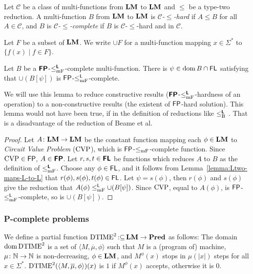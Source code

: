 \documentclass[envcountsame,orivec,oribibl]{llncs}
\newcommand{\pcolon}{\mathpunct{\,:\subseteq}}
\begin{document}
Let $\mathcal{C}$ be a class of multi-functions from $\mathbf{LM}$ to $\mathbf{LM}$
and $\leq$ be a type-two reduction.
A multi-function $B$ from $\mathbf{LM}$ to $\mathbf{LM}$ is \emph{$\mathcal{C}$-$\leq$-hard} if $A \leq B$ for all $A \in \mathcal{C}$,
and $B$ is \emph{$\mathcal{C}$-$\leq$-complete} 
if $B$ is $\mathcal{C}$-$\leq$-hard and in $\mathcal{C}$.


Let $F$ be a subset of $\mathbf{LM}$.
We write $\cup F$ for a multi-function mapping $x \in \Sigma^*$ to 
$\{f(x) \mid f \in F\}$.

\begin{lemma}
\label{lemma:P-complete}
Let $B$ be a $\text{\bfseries \sffamily \upshape FP}$-$\leq _{\mathrm{mF}} ^{\text{\bfseries \sffamily \upshape L}}$-complete multi-function.
There is $\psi \in \mathop{\rm dom} B \cap \mathsf{FL}$ satisfying that
 $\cup (B[\psi])$ is $\mathsf{FP}$-$\le^{\mathsf{L}}_{\mathrm{mF}}$-complete.
\end{lemma}

We will use this lemma to reduce constructive results
($\text{\bfseries \sffamily \upshape FP}$-$\leq _{\mathrm{mF}} ^{\text{\bfseries \sffamily \upshape L}}$-hardness of an operation) to a non-constructive 
results (the existent of $\mathsf{FP}$-hard solution).
This lemma would not have been true, if in the definition 
of reductions like $\leq _{\mathrm B} ^{\text{\bfseries \sffamily \upshape L}}$ \cite[Lemma~3.6]{kawamura2012complexity}.
That is a disadvantage of the reduction of Beame et al.

\begin{proof}
Let $A \colon \mathbf{LM} \to \mathbf{LM}$ be the constant function mapping each $\phi \in \mathbf{LM}$ to \emph{Circuit Value Problem} ($\mathrm{CVP}$), which is $\mathsf{FP}$-$\leq _{\mathrm{mF}}$-complete function.
Since $\mathrm{CVP} \in \mathsf{FP}$, $A \in \text{\bfseries \sffamily \upshape FP}$.
Let $r, s, t \in \text{\bfseries \sffamily \upshape FL}$ be functions which reduces $A$ to $B$
as the definition of $\leq _{\mathrm{mF}} ^{\text{\bfseries \sffamily \upshape L}}$.
Choose any $\phi \in \mathsf{FL}$, and it follows from Lemma~\ref{lemma:Ltwo-maps-L-to-L}
that $r(\phi), s(\phi), t(\phi) \in \mathsf{FL}$.
Let $\psi = s(\phi)$, then $r(\phi)$ and $s(\phi)$ give the reduction that
$A(\phi) \leq _{\mathrm{mF}}^{\mathsf{L}} \cup (B[\psi])$.
Since $\mathrm{CVP}$, equal to $A(\phi)$, is $\mathsf{FP}$-$\leq _{\mathrm{mF}}^{\mathsf{L}}$-complete,
so is $\cup (B[\psi])$.
\end{proof}


\subsubsection{P-complete problems}

We define a partial function $\probDTIMEtwo \pcolon \LM \to \Pred$  as follows:
The domain $\mathop{\rm dom} \mathrm{DTIME}^2$ is a set of $\langle M, \overline \mu, \phi \rangle$
such that $M$ is a (program of) machine, $\mu \colon \mathbb N \to \mathbb N$ is non-decreasing, $\phi \in \mathbf{LM}$, and $M^\phi(x)$ stops in $\mu(|x|)$ steps for all $x \in \Sigma^*$.
$\mathrm{DTIME}^2(\langle M, \overline \mu, \phi \rangle)(x)$ is $1$ if
$M^\phi(x)$ accepts, otherwise it is 0.
\end{document}
